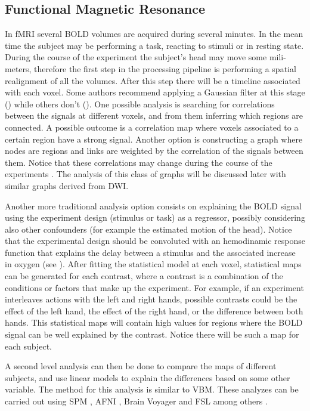 \subsection{Functional Magnetic Resonance}

In fMRI several BOLD volumes are acquired during several minutes. In the mean time the subject may be performing a task, reacting to stimuli or in resting state. During the course of the experiment the subject's head may move some mili-meters, therefore the first step in the processing pipeline is performing a spatial realignment of all the volumes. After this step there will be a timeline associated with each voxel. Some authors recommend applying a Gaussian filter at this stage (\autocite{friston_statistical_2007}) while others don't (\autocite{goebel_brainvoyagerpast_2012}). One possible analysis is searching for correlations between the signals at different voxels, and from them inferring which regions are connected. A possible outcome is a correlation map where voxels associated to a certain region have a strong signal. Another option is constructing a graph where nodes are regions and links are weighted by the correlation of the signals between them. Notice that these correlations may change during the course of the experiments \autocite{richiardi_decoding_2011}. The analysis of this class of graphs will be discussed later with similar graphs derived from DWI. 

Another more traditional analysis option consists on explaining the BOLD signal using the experiment design (stimulus or task) as a regressor, possibly considering also other confounders (for example the estimated motion of the head). Notice that the experimental design should be convoluted with an hemodinamic response function that explains the delay between a stimulus and the associated increase in oxygen (see \autocite{poldrack_handbook_2011}). After fitting the statistical model at each voxel, statistical maps can be generated for each contrast, where a contrast is a combination of the conditions or factors that make up the experiment. For example, if an experiment interleaves actions with the left and right hands, possible contrasts could be the effect of the left hand, the effect of the right hand, or the difference between both hands. This statistical maps will contain high values for regions where the BOLD signal can be well explained by the contrast. Notice there will be such a map for each subject.

A second level analysis can then be done to compare the maps of different subjects, and use linear models to explain the differences based on some other variable. The method for this analysis is similar to VBM. These analyzes can be carried out using SPM \autocite{friston_statistical_2007}, AFNI \autocite{cox_afni:_1996}, Brain Voyager \autocite{goebel_brainvoyagerpast_2012} and FSL \autocite{jenkinson_fsl_2012} among others \autocite{gold_functional_1998}.

